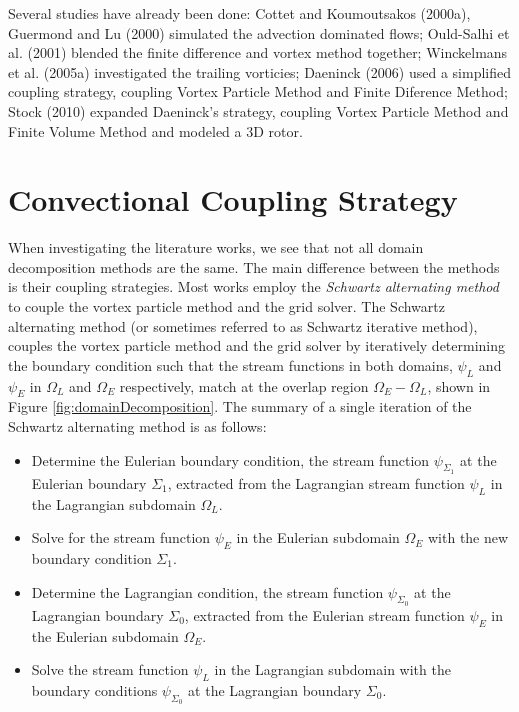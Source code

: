 	Several studies have already been done: Cottet and Koumoutsakos (2000a)\cite{Cottet2000a}, Guermond and Lu (2000) \cite{Guermond2000a} simulated the advection dominated flows; Ould-Salhi et al. (2001) \cite{Ould-Salihi2001a} blended the finite difference and vortex method together; Winckelmans et al. (2005a) \cite{Winckelmans2005} investigated the trailing vorticies; Daeninck (2006) \cite{Daeninck2006} used a simplified coupling strategy, coupling Vortex Particle Method and Finite Diference Method; Stock (2010) \cite{Stock2010a} expanded Daeninck's strategy, coupling Vortex Particle Method and Finite Volume Method and modeled a 3D rotor.

	\section{Convectional Coupling Strategy}
	\label{sec:helvpm-ccs}
	
	When investigating the literature works, we see that not all domain decomposition methods are the same. The main difference between the methods is their coupling strategies. Most works employ the\textit{ Schwartz alternating method} to couple the vortex particle method and the grid solver. The Schwartz alternating method (or sometimes referred to as Schwartz iterative method), couples the vortex particle method and the grid solver by iteratively determining the boundary condition such that the stream functions in both domains, $\psi_L$ and $\psi_E$ in $\Omega_L$ and $\Omega_E$ respectively, match at the overlap region $\Omega_E-\Omega_L$, shown in Figure \ref{fig:domainDecomposition}. The summary of a single iteration of the Schwartz alternating method is as follows:
	
		\begin{itemize}
		\item Determine the Eulerian boundary condition, the stream function $\psi_{\Sigma_1}$ at the Eulerian boundary $\Sigma_1$, extracted from the Lagrangian stream function $\psi_L$ in the Lagrangian subdomain $\Omega_L$.
		\item Solve for the stream function $\psi_E$ in the Eulerian subdomain $\Omega_E$ with the new boundary condition $\Sigma_1$.
		\item Determine the Lagrangian condition, the stream function $\psi_{\Sigma_0}$ at the Lagrangian boundary $\Sigma_0$, extracted from the Eulerian stream function $\psi_E$ in the Eulerian subdomain $\Omega_E$.
		\item Solve the stream function $\psi_L$ in the Lagrangian subdomain with the boundary conditions $\psi_{\Sigma_0}$ at the Lagrangian boundary $\Sigma_0$.
		\end{itemize}
	
